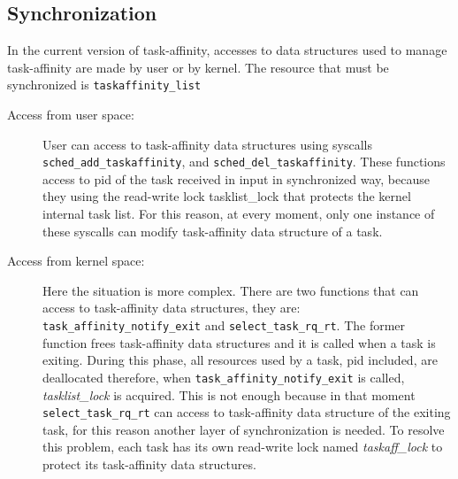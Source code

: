 \subsection{Synchronization}

In the current version of task-affinity, accesses to data structures used to manage task-affinity are made by user or by kernel. The resource that must be
synchronized is \texttt{taskaffinity\_list}

\begin{description}

\item[Access from user space:] User can access to task-affinity data structures using syscalls \texttt{sched\_add\_taskaffinity}, and 
\texttt{sched\_del\_taskaffinity}. These functions access to pid of the task received in input in synchronized way, because they using the read-write lock
tasklist\_lock that protects the kernel internal task list. For this reason, at every moment, only one instance of these syscalls can modify task-affinity 
data structure of a task.

\item[Access from kernel space:] Here the situation is more complex. There are two functions that can access to task-affinity data structures, they are:
\texttt{task\_affinity\_notify\_exit} and \texttt{select\_task\_rq\_rt}. The former function frees task-affinity data structures and it is called when a 
task is exiting. During this phase, all resources used by a task, pid included, are deallocated therefore, when \texttt{task\_affinity\_notify\_exit} is 
called, \textit{tasklist\_lock} is acquired. This is not enough because in that moment \texttt{select\_task\_rq\_rt} can access to task-affinity data 
structure of the exiting task, for this reason another layer of synchronization is needed. To resolve this problem, each task has its own read-write lock 
named \textit{taskaff\_lock} to protect its task-affinity data structures. 

\end{description}


